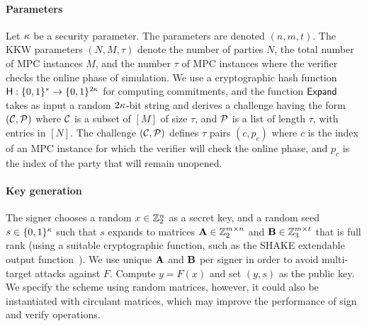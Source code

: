 \paragraph{Parameters} Let $\kappa$ be a security parameter.  The
\ttOWF parameters are denoted $(n, m, t)$.  The KKW parameters $(N, M,
\tau)$ denote the number of parties $N$, the total number of MPC instances $M$,
and the number $\tau$ of MPC instances where the verifier checks the online
phase of simulation. 
We use a cryptographic hash function $\textsf{H}: \{0,1\}^*\to \{0,1\}^{2\kappa}$
for computing commitments, and the function $\textsf{Expand}$ takes as input a random $2\kappa$-bit string
and derives a challenge having the form $(\mathcal{C}, \mathcal{P})$ where $\mathcal{C}$ is a subset of $[M]$
of size $\tau$, and $\mathcal{P}$ is a list of length $\tau$, with entries in $[N]$. 
The challenge $(\mathcal{C}, \mathcal{P})$ defines $\tau$ pairs $(c,p_c)$ where $c$ is the
index of  an MPC instance for which the verifier will check the online phase,
and $p_c$ is the index of the party that will remain unopened. 

\paragraph{Key generation} The signer chooses a random $x \in \mathbb{Z}_2^n$ as a
secret key, and a random seed $s \in \{0,1\}^{\kappa}$ such that $s$
expands to matrices $\mathbf{A} \in \mathbb{Z}_2^{m\times n}$ and $\mathbf{B}\in \mathbb{Z}_3^{m\times t}$ that is full rank (using a suitable cryptographic
function, such as the SHAKE extendable output function~\cite{sp800-185}).  We
use unique $\mathbf{A}$ and $\mathbf{B}$ per signer in order to avoid multi-target attacks against $F$.
Compute $y = F(x)$ and set $(y, s)$ as the public key.
We specify the scheme using random matrices, however, it could also be instantiated
with circulant matrices, which may improve the performance of sign and verify operations.

